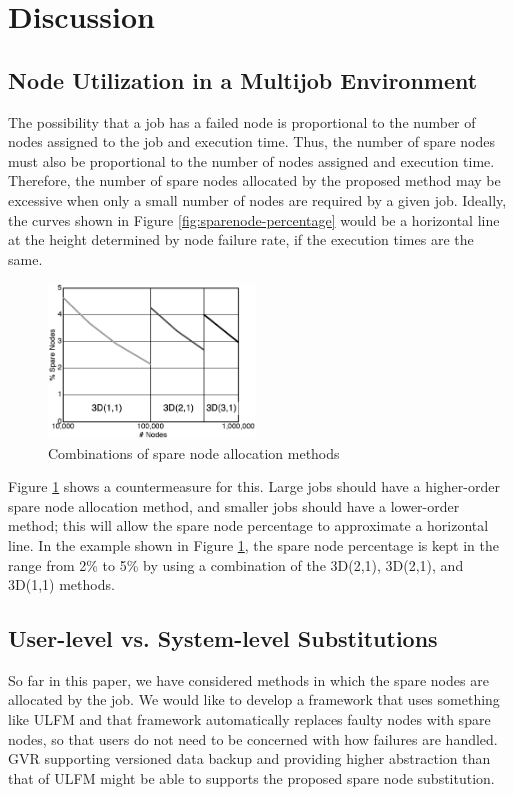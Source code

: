 \documentclass[Afour,times,sageh]{sagej}
\begin{document}
\section{Discussion}

\subsection{Node Utilization in a Multijob Environment}
\label{sec:multi-job}

The possibility that a job has a failed node is proportional to the
number of nodes assigned to the job and execution time. Thus, the
number of spare nodes must also be proportional to the number of nodes
assigned and execution time. Therefore, the number of spare nodes
allocated by the proposed method may be excessive when only a small
number of nodes are required by a given job. Ideally, the curves shown
in Figure \ref{fig:sparenode-percentage} would be a horizontal line at
the height determined by node failure rate, if the execution times are
the same.

\begin{figure}[ht]
\centering
\includegraphics[width=55mm]{Figs/R-SpareNodes-combo.eps}
  \caption{Combinations of spare node allocation methods}
  \label{fig:combo-percentage}
\end{figure}

Figure \ref{fig:combo-percentage} shows a countermeasure for
this. Large jobs should have a higher-order spare node allocation
method, and smaller jobs should have a lower-order method; this will
allow the spare node percentage to approximate a horizontal line. In
the example shown in Figure \ref{fig:combo-percentage}, the spare node
percentage is kept in the range from 2\% to 5\% by using a combination
of the 3D(2,1), 3D(2,1), and 3D(1,1) methods.

\subsection{User-level vs. System-level Substitutions}

So far in this paper, we have considered methods in which the spare
nodes are allocated by the job. We would like to develop a framework
that uses something like ULFM and that framework automatically
replaces faulty nodes with spare nodes, so that users do not need to
be concerned with how failures are handled. GVR supporting versioned
data backup and providing higher abstraction than that of ULFM might
be able to supports the proposed spare node substitution.
\end{document}
